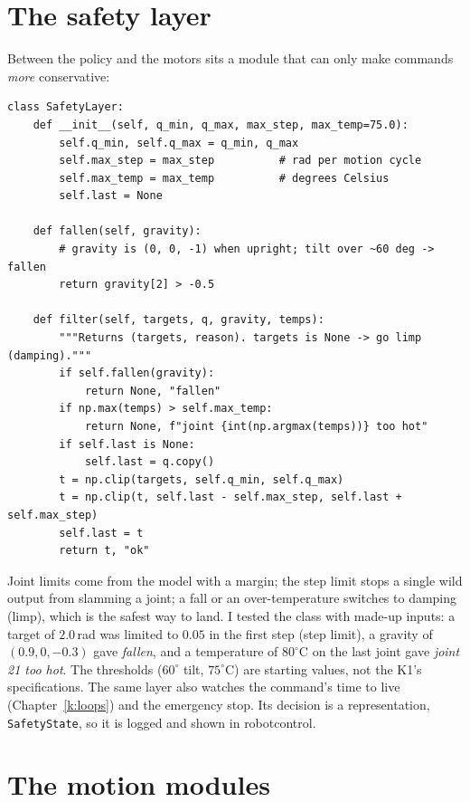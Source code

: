 \section*{The safety layer}
Between the policy and the motors sits a module that can only make commands \emph{more} conservative:
\begin{verbatim}
class SafetyLayer:
    def __init__(self, q_min, q_max, max_step, max_temp=75.0):
        self.q_min, self.q_max = q_min, q_max
        self.max_step = max_step          # rad per motion cycle
        self.max_temp = max_temp          # degrees Celsius
        self.last = None

    def fallen(self, gravity):
        # gravity is (0, 0, -1) when upright; tilt over ~60 deg -> fallen
        return gravity[2] > -0.5

    def filter(self, targets, q, gravity, temps):
        """Returns (targets, reason). targets is None -> go limp (damping)."""
        if self.fallen(gravity):
            return None, "fallen"
        if np.max(temps) > self.max_temp:
            return None, f"joint {int(np.argmax(temps))} too hot"
        if self.last is None:
            self.last = q.copy()
        t = np.clip(targets, self.q_min, self.q_max)
        t = np.clip(t, self.last - self.max_step, self.last + self.max_step)
        self.last = t
        return t, "ok"
\end{verbatim}
Joint limits come from the model with a margin; the step limit stops a single wild output from slamming a joint; a fall or an over-temperature switches to damping (limp), which is the safest way to land. I tested the class with made-up inputs: a target of $2.0$\,rad was limited to $0.05$ in the first step (step limit), a gravity of $(0.9,0,-0.3)$ gave \emph{fallen}, and a temperature of $80^\circ$C on the last joint gave \emph{joint 21 too hot}. The thresholds ($60^\circ$ tilt, $75^\circ$C) are starting values, not the K1's specifications\guess. The same layer also watches the command's time to live (Chapter~\ref{k:loops}) and the emergency stop. Its decision is a representation, \texttt{SafetyState}, so it is logged and shown in robotcontrol.

\section*{The motion modules}
\begin{center}
\end{center}

